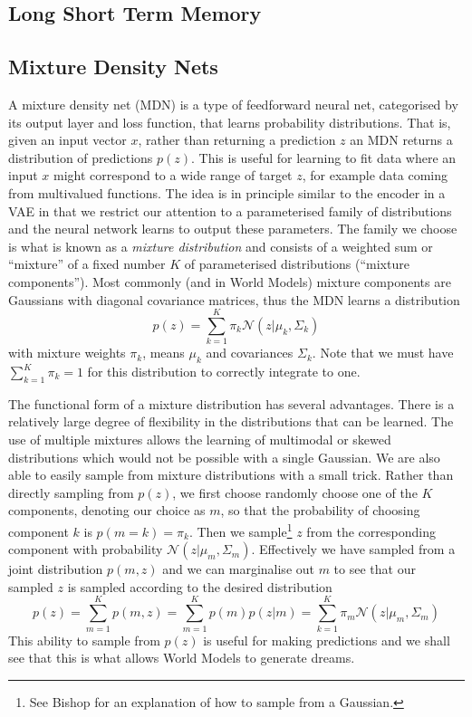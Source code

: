 \documentclass{article}
\theoremstyle{definition}
\begin{document}
\subsection{Long Short Term Memory}

\subsection{Mixture Density Nets}
A mixture density net (MDN) is a type of feedforward neural net, categorised by its output layer and loss function, that learns probability distributions.
That is, given an input vector $x$, rather than returning a prediction $z$ an MDN returns a distribution of predictions $p(z)$.
This is useful for learning to fit data where an input $x$ might correspond to a wide range of target $z$, for example data coming from multivalued functions.
The idea is in principle similar to the encoder in a VAE in that we restrict our attention to a parameterised family of distributions and the neural network learns to output these parameters.
The family we choose is what is known as a \textit{mixture distribution} and consists of a weighted sum or ``mixture'' of a fixed number $K$ of parameterised distributions (``mixture components'').
Most commonly (and in World Models) mixture components are Gaussians with diagonal covariance matrices, thus the MDN learns a distribution
$$p(z) = \sum_{k=1}^K \pi_k \mathcal{N}\left(z|\mu_k, \Sigma_k\right)$$
with mixture weights $\pi_k$, means $\mu_k$ and covariances $\Sigma_k$.
Note that we must have $\sum_{k=1}^K \pi_k = 1$ for this distribution to correctly integrate to one.


The functional form of a mixture distribution has several advantages.
There is a relatively large degree of flexibility in the distributions that can be learned.
The use of multiple mixtures allows the learning of multimodal or skewed distributions which would not be possible with a single Gaussian.
We are also able to easily sample from mixture distributions with a small trick.
Rather than directly sampling from $p(z)$, we first choose randomly choose one of the $K$ components, denoting our choice as $m$, so that the probability of choosing component $k$ is $p(m=k) =\pi_k$.
Then we sample\footnote{See Bishop for an explanation of how to sample from a Gaussian.} $z$ from the corresponding component with probability $\mathcal{N}(z| \mu_m, \Sigma_m)$. %
Effectively we have sampled from a joint distribution $p(m,z)$ and we can marginalise out $m$ to see that our sampled $z$ is sampled according to the desired distribution
$$p(z) = \sum_{m=1}^K p(m,z) = \sum_{m=1}^K p(m)p(z|m) = \sum_{k=1}^K \pi_m \mathcal{N}\left(z|\mu_m, \Sigma_m\right)$$
This ability to sample from $p(z)$ is useful for making predictions and we shall see that this is what allows World Models to generate dreams.
\end{document}
